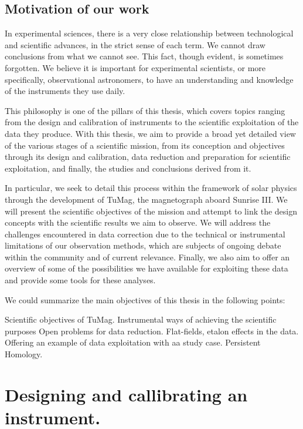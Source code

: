 \documentclass[12pt]{mythesis}
\begin{document}
\section{Motivation of our work}

In experimental sciences, there is a very close relationship between technological and scientific advances, in the strict sense of each term. We cannot draw conclusions from what we cannot see. This fact, though evident, is sometimes forgotten. We believe it is important for experimental scientists, or more specifically, observational astronomers, to have an understanding and knowledge of the instruments they use daily.

This philosophy is one of the pillars of this thesis, which covers topics ranging from the design and calibration of instruments to the scientific exploitation of the data they produce. With this thesis, we aim to provide a broad yet detailed view of the various stages of a scientific mission, from its conception and objectives through its design and calibration, data reduction and preparation for scientific exploitation, and finally, the studies and conclusions derived from it.

In particular, we seek to detail this process within the framework of solar physics through the development of TuMag, the magnetograph aboard Sunrise III. We will present the scientific objectives of the mission and attempt to link the design concepts with the scientific results we aim to observe. We will address the challenges encountered in data correction due to the technical or instrumental limitations of our observation methods, which are subjects of ongoing debate within the community and of current relevance. Finally, we also aim to offer an overview of some of the possibilities we have available for exploiting these data and provide some tools for these analyses. 

We could summarize the main objectives of this thesis in the following points:

\begin{itemize}
  \Myitem Scientific objectives of TuMag.
  \Myitem Instrumental ways of achieving the scientific purposes
  \Myitem Open problems for data reduction. Flat-fields, etalon effects in the data. 
  \Myitem Offering an example of data exploitation with aa study case. Persistent Homology.
\end{itemize}





\chapter{Designing and callibrating an instrument.}
\end{document}
